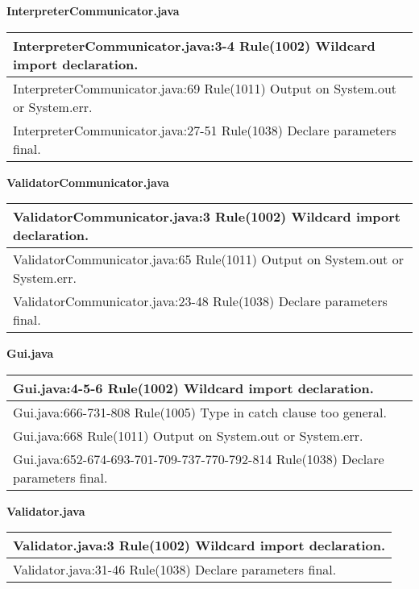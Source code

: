 \textbf{InterpreterCommunicator.java}
\begin{center}
\begin{tabular}{|p{12cm}|} \hline
InterpreterCommunicator.java:3-4 Rule(1002) Wildcard import declaration. \\ \hline
InterpreterCommunicator.java:69 Rule(1011) Output on System.out or System.err. \\ \hline
InterpreterCommunicator.java:27-51 Rule(1038) Declare parameters final.\\ \hline
\end{tabular}
\end{center}

\textbf{ValidatorCommunicator.java}
\begin{center}
\begin{tabular}{|p{12cm}|} \hline
ValidatorCommunicator.java:3 Rule(1002) Wildcard import declaration. \\ \hline
ValidatorCommunicator.java:65 Rule(1011) Output on System.out or System.err. \\ \hline
ValidatorCommunicator.java:23-48 Rule(1038) Declare parameters final. \\ \hline
\end{tabular}
\end{center}

\textbf{Gui.java}
\begin{center}
\begin{tabular}{|p{12cm}|} \hline
Gui.java:4-5-6 Rule(1002) Wildcard import declaration.\\ \hline
Gui.java:666-731-808 Rule(1005) Type in catch clause too general.\\ \hline
Gui.java:668 Rule(1011) Output on System.out or System.err.\\ \hline
Gui.java:652-674-693-701-709-737-770-792-814 Rule(1038) Declare parameters final.\\ \hline
\end{tabular}
\end{center}

\textbf{Validator.java}
\begin{center}
\begin{tabular}{|p{12cm}|} \hline
Validator.java:3 Rule(1002) Wildcard import declaration.\\ \hline
Validator.java:31-46 Rule(1038) Declare parameters final.\\ \hline
\end{tabular}
\end{center}

